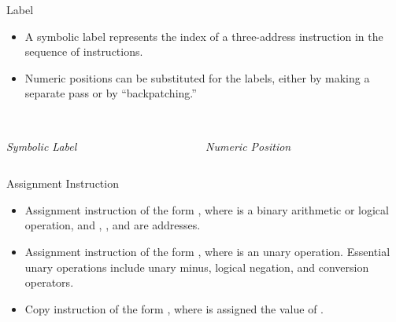 \begin{bibunit}[apalike]
\begin{frame}{Label}
	\begin{itemize}
	\item A symbolic label represents the index of a three-address instruction in the sequence of instructions.
	\item Numeric positions can be substituted for the labels, either by making a separate pass or by ``backpatching.''
	\end{itemize}
	\begin{columns}
		\begin{column}{.4\linewidth}
			\begin{center}
			\begin{tac}[\linewidth]
			\end{tac} \\[1em]
			\emph{Symbolic Label}
			\end{center}
		\end{column}
		\begin{column}{.5\linewidth}
			\begin{center}
			\begin{tac}[\linewidth]
			\end{tac} \\[1em]
			\emph{Numeric Position}
			\end{center}
		\end{column}
	\end{columns}
\end{frame}

\begin{frame}{Assignment Instruction}
	\begin{itemize}
	\item Assignment instruction of the form \emph{}, where  is a binary arithmetic or logical operation, and , , and  are addresses.
	\vfill
	\item Assignment instruction of the form \emph{}, where  is an unary operation. Essential unary operations include unary minus, logical negation, and conversion operators.
	\vfill
	\item Copy instruction of the form \emph{}, where  is assigned the value of .
	\end{itemize}
\end{frame}


\end{bibunit}
